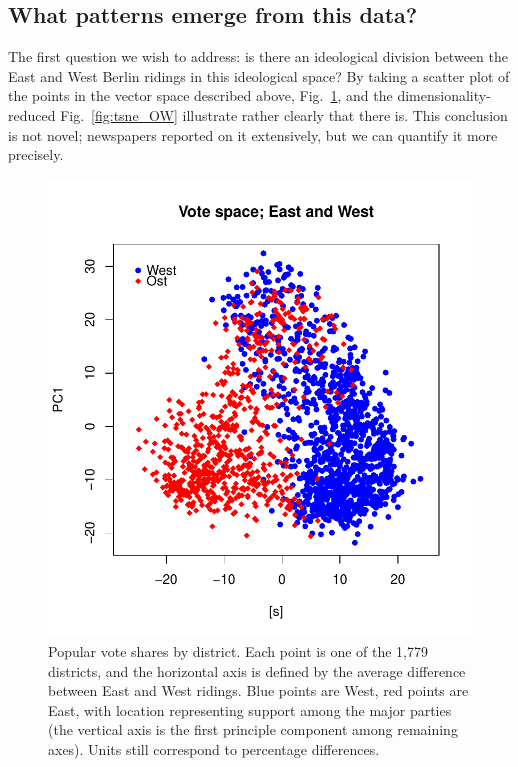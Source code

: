 \documentclass[amsmath,amssymb,nofootinbib,12pt,preprint]{revtex4}
\begin{document}

\subsection{What patterns emerge from this data?}
The first question we wish to address: is there an ideological division between the East and West Berlin ridings in this ideological space? By taking a scatter plot of the points in the vector space described above, Fig.~\ref{fig:OstWest_div}, and the dimensionality-reduced Fig.~\ref{fig:tsne_OW} illustrate rather clearly that there is. This conclusion is not novel; newspapers reported on it extensively, but we can quantify it more precisely.

\begin{figure}[h]%
\includegraphics[scale=.85]{../figures/OstWest_Vote2}%
\caption{ Popular vote shares by district. Each point is one of the 1,779 districts, and the horizontal axis is defined by the average difference between East and West ridings. Blue points are West, red points are East, with location representing support among the major parties (the vertical axis is the first principle component among remaining axes). Units still correspond to percentage differences. }
\label{fig:OstWest_div}%
\end{figure}
\end{document}
